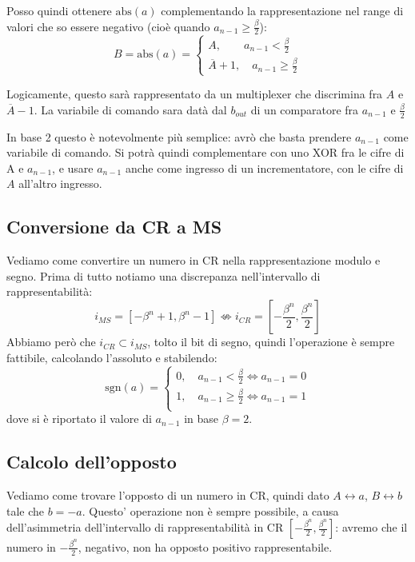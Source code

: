 \documentclass[a4paper,11pt]{article}
\begin{document}
Posso quindi ottenere $\mathrm{abs}(a)$ complementando la rappresentazione nel range di valori che so essere negativo (cioè quando $a_{n-1} \geq \frac{\beta}{2}$):
\[
	B = \mathrm{abs}(a) =
	\begin{cases}
		A, \quad \quad a_{n-1} < \frac{\beta}{2} \\ 
		\overline{A} +  1, \quad a_{n-1} \geq \frac{\beta}{2}
	\end{cases}
\]

Logicamente, questo sarà rappresentato da un multiplexer che discrimina fra $A$ e $\overline{A} - 1$.
La variabile di comando sara datà dal $b_{out}$ di un comparatore fra $a_{n-1}$ e $\frac{\beta}{2}$

In base 2 questo è notevolmente più semplice: avrò che basta prendere $a_{n-1}$ come variabile di comando.
Si potrà quindi complementare con uno XOR fra le cifre di A e $a_{n-1}$, e usare $a_{n-1}$ anche come ingresso di un incrementatore, con le cifre di $A$ all'altro ingresso.

\subsection{Conversione da CR a MS}
Vediamo come convertire un numero in CR nella rappresentazione modulo e segno.
Prima di tutto notiamo una discrepanza nell'intervallo di rappresentabilità:
$$
i_{MS} = [-\beta^n + 1, \beta^n - 1] \not\Leftrightarrow i_{CR} = \left[-\frac{\beta^n}{2}, \frac{\beta^n}{2}\right]
$$
Abbiamo però che $i_{CR} \subset i_{MS}$, tolto il bit di segno, quindi l'operazione è sempre fattibile, calcolando l'assoluto e stabilendo:
$$
\mathrm{sgn}(a) = 
	\begin{cases}
		0, \quad a_{n-1} < \frac{\beta}{2} \Leftrightarrow a_{n-1} = 0 \\ 
		1, \quad a_{n-1} \geq \frac{\beta}{2} \Leftrightarrow a_{n-1} = 1 \\ 
	\end{cases}
$$
dove si è riportato il valore di $a_{n-1}$ in base $\beta = 2$.

\subsection{Calcolo dell'opposto}
Vediamo come trovare l'opposto di un numero in CR, quindi dato $A \leftrightarrow a$, $B \leftrightarrow b$ tale che $ b = -a$.
Questo' operazione non è sempre possibile, a causa dell'asimmetria dell'intervallo di rappresentabilità in CR $\left[-\frac{\beta^n}{2}, \frac{\beta^n}{2}\right]$: avremo che il numero in $-\frac{\beta^n}{2}$, negativo, non ha opposto positivo rappresentabile.
\end{document}
